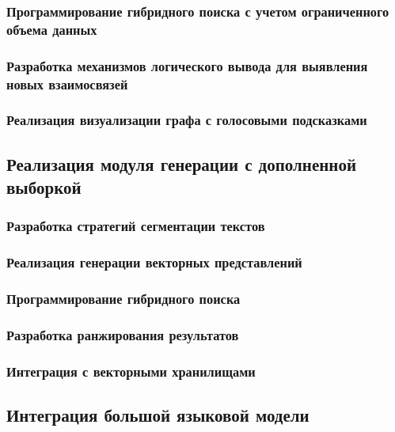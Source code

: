 \documentclass{syksu-coursework}
\begin{document}
\subsubsection{Программирование гибридного поиска с учетом ограниченного объема данных}

\subsubsection{Разработка механизмов логического вывода для выявления новых взаимосвязей}

\subsubsection{Реализация визуализации графа с голосовыми подсказками}

\subsection{Реализация модуля генерации с дополненной выборкой}

\subsubsection{Разработка стратегий сегментации текстов}

\subsubsection{Реализация генерации векторных представлений}

\subsubsection{Программирование гибридного поиска}

\subsubsection{Разработка ранжирования результатов}

\subsubsection{Интеграция с векторными хранилищами}

\subsection{Интеграция большой языковой модели}
\end{document}
